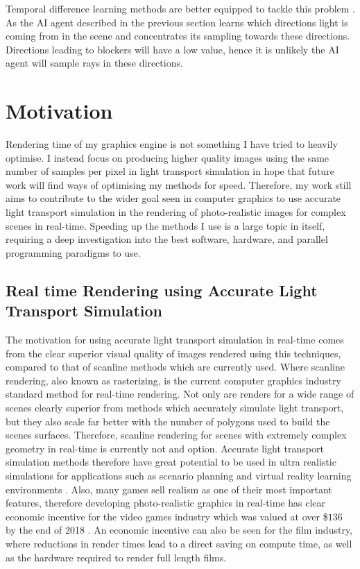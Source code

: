 \documentclass[../dissertation.tex]{subfiles}
\begin{document}
Temporal difference learning methods are better equipped to tackle this problem 
\cite{dahm2017learning}. As the AI agent described in the previous section learns 
which directions light is coming from in the scene and concentrates its sampling 
towards these directions. Directions leading to blockers will have a low value, 
hence it is unlikely the AI agent will sample rays in these directions.\\

\section{Motivation}
\label{sec:motivation}

Rendering time of my graphics engine is not something I have tried to heavily 
optimise. I instead focus on producing higher quality images using the same 
number of samples per pixel in light transport simulation in hope that future 
work will find ways of optimising my methods for speed. Therefore, my work 
still aims to contribute to the wider goal seen in computer graphics to use 
accurate light transport simulation in the rendering of photo-realistic images 
for complex scenes in real-time.  Speeding up the methods I use is a large 
topic in itself, requiring a deep investigation into the best software, hardware, 
and parallel programming paradigms to use.\\

\subsection{Real time Rendering using Accurate Light Transport Simulation}
The motivation for using accurate light transport simulation in real-time 
comes from the clear superior visual quality of images rendered using this 
techniques, compared to that of scanline methods which are currently used. 
Where scanline rendering, also known as rasterizing, is the current computer 
graphics industry standard method for real-time rendering. Not only are 
renders for a wide range of scenes clearly superior from methods which 
accurately simulate light transport, but they also scale far better with the 
number of polygons used to build the scenes surfaces. Therefore, scanline 
rendering for scenes with extremely complex geometry in real-time is currently 
not and option. Accurate light transport simulation methods therefore have 
great potential to be used in ultra realistic simulations for applications such 
as scenario planning and virtual reality learning environments \cite{pan2006virtual}. 
Also, many games sell realism as one of their most important features, therefore 
developing photo-realistic graphics in real-time has clear economic incentive for 
the video games industry which was valued at over \$$136$ by the end of 2018 
\cite{bloomberg.com}. An economic incentive can also be seen for the film
industry, where reductions in render times lead to a direct saving on compute 
time, as well as the hardware required to render full length films.
\end{document}
